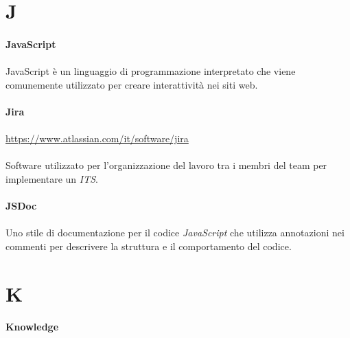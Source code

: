 \documentclass[10pt, a4paper]{article}
\begin{document}
\newpage
\section{J}
\vspace{2em}
\paragraph{JavaScript}\noindent\hrulefill
\paragraph{}JavaScript è un linguaggio di programmazione interpretato che viene comunemente utilizzato per creare interattività nei siti web.

\vspace{2em}
\paragraph{Jira}\noindent\hrulefill
\paragraph{}\href{https://www.atlassian.com/it/software/jira}{https://www.atlassian.com/it/software/jira}\\\\
Software utilizzato per l'organizzazione del lavoro tra i membri del team per implementare un \textit{ITS\pg}.

\vspace{2em}
\paragraph{JSDoc}\noindent\hrulefill
\paragraph{}Uno stile di documentazione per il codice \textit{JavaScript\pg} che utilizza annotazioni nei commenti per descrivere la struttura e il comportamento del codice.




\newpage
\section{K}
\vspace{2em}
\paragraph{Knowledge}\noindent\hrulefill
\end{document}
